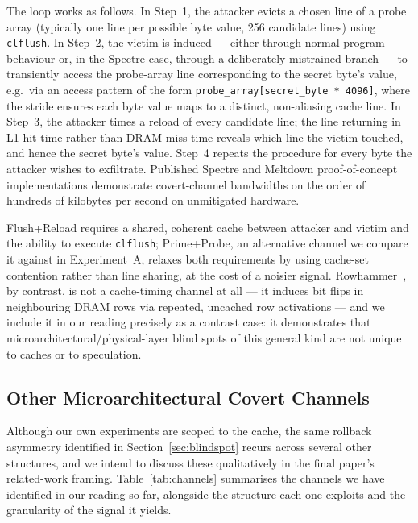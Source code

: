 \documentclass[11pt,a4paper]{article}
\begin{document}
The loop works as follows. In Step~1, the attacker evicts a chosen line of a
probe array (typically one line per possible byte value, 256 candidate lines)
using \texttt{clflush}. In Step~2, the victim is induced --- either through
normal program behaviour or, in the Spectre case, through a deliberately
mistrained branch --- to transiently access the probe-array line corresponding
to the secret byte's value, e.g.\ via an access pattern of the form
\texttt{probe\_array[secret\_byte * 4096]}, where the stride ensures each byte
value maps to a distinct, non-aliasing cache line. In Step~3, the attacker
times a reload of every candidate line; the line returning in L1-hit time
rather than DRAM-miss time reveals which line the victim touched, and hence the
secret byte's value. Step~4 repeats the procedure for every byte the attacker
wishes to exfiltrate. Published Spectre and Meltdown proof-of-concept
implementations demonstrate covert-channel bandwidths on the order of hundreds
of kilobytes per second on unmitigated hardware.

Flush+Reload requires a shared, coherent cache between attacker and victim and
the ability to execute \texttt{clflush}; Prime+Probe, an alternative channel we
compare it against in Experiment~A, relaxes both requirements by using
cache-set contention rather than line sharing, at the cost of a noisier signal.
Rowhammer~\cite{kim2014rowhammer}, by contrast, is not a cache-timing channel
at all --- it induces bit flips in neighbouring DRAM rows via repeated, uncached
row activations --- and we include it in our reading precisely as a contrast
case: it demonstrates that microarchitectural/physical-layer blind spots of
this general kind are not unique to caches or to speculation.

\subsection{Other Microarchitectural Covert Channels}
\label{sec:otherchannels}

Although our own experiments are scoped to the cache, the same rollback
asymmetry identified in Section~\ref{sec:blindspot} recurs across several
other structures, and we intend to discuss these qualitatively in the final
paper's related-work framing. Table~\ref{tab:channels} summarises the
channels we have identified in our reading so far, alongside the structure
each one exploits and the granularity of the signal it yields.
\end{document}
